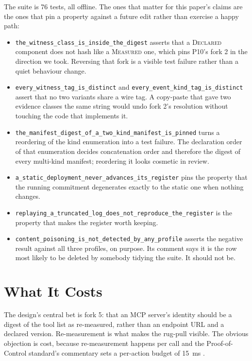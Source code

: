 \documentclass[11pt]{article}
\begin{document}
The suite is 76 tests, all offline. The ones that matter for this paper's
claims are the ones that pin a property against a future edit rather than
exercise a happy path:

\begin{itemize}[leftmargin=1.2em, itemsep=0.15em]
\item \texttt{the\_witness\_class\_is\_inside\_the\_digest} asserts that a
      \textsc{Declared} component does not hash like a \textsc{Measured} one,
      which pins P10's fork 2 in the direction we took. Reversing that fork is
      a visible test failure rather than a quiet behaviour change.
\item \texttt{every\_witness\_tag\_is\_distinct} and
      \texttt{every\_event\_kind\_tag\_is\_distinct} assert that no two
      variants share a wire tag. A copy-paste that gave two evidence classes
      the same string would undo fork 2's resolution without touching the code
      that implements it.
\item \texttt{the\_manifest\_digest\_of\_a\_two\_kind\_manifest\_is\_pinned}
      turns a reordering of the kind enumeration into a test failure. The
      declaration order of that enumeration decides concatenation order and
      therefore the digest of every multi-kind manifest; reordering it looks
      cosmetic in review.
\item \texttt{a\_static\_deployment\_never\_advances\_its\_register} pins the
      property that the running commitment degenerates exactly to the static
      one when nothing changes.
\item \texttt{replaying\_a\_truncated\_log\_does\_not\_reproduce\_the\_register}
      is the property that makes the register worth keeping.
\item \texttt{content\_poisoning\_is\_not\_detected\_by\_any\_profile}
      asserts the negative result against all three profiles, on purpose. Its
      comment says it is the row most likely to be deleted by somebody tidying
      the suite. It should not be.
\end{itemize}

\section{What It Costs}
\label{sec:cost}

The design's central bet is fork 5: that an MCP server's identity should be a
digest of the tool list as re-measured, rather than an endpoint URL and a
declared version. Re-measurement is what makes the rug-pull visible. The
obvious objection is cost, because re-measurement happens per call and the
Proof-of-Control standard's commentary sets a per-action budget of
\SI{15}{\milli\second} \cite{pocspec}.
\end{document}
